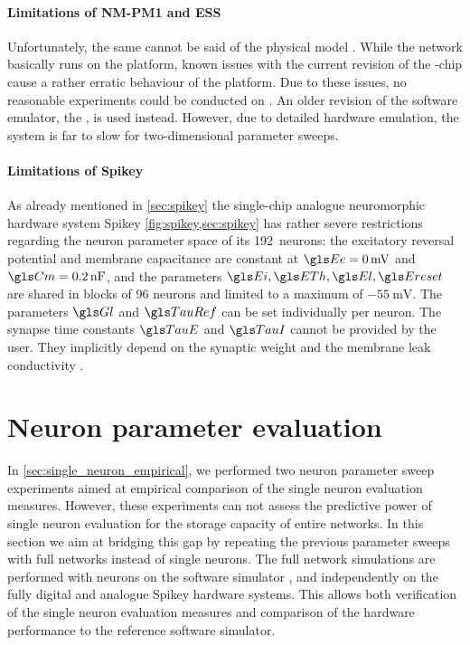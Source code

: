 \paragraph{Limitations of NM-PM1 and ESS}
Unfortunately, the same cannot be said of the physical model \NMPM. While the network basically runs on the platform, known issues with the current revision of the \mbox{\HICANN}-chip cause a rather erratic behaviour of the platform. Due to these issues, no reasonable experiments could be conducted on \NMPM. An older revision of the \NMPM software emulator, the \ESS, is used instead. However, due to detailed hardware emulation, the system is far to slow for two-dimensional parameter sweeps.

\paragraph{Limitations of Spikey}
As already mentioned in \cref{sec:spikey} the single-chip analogue neuromorphic hardware system Spikey \cref{fig:spikey,sec:spikey} has rather severe restrictions regarding the neuron parameter space of its 192~\LIF neurons: the excitatory reversal potential and membrane capacitance are constant at $\Ee = \SI{0}{\milli\volt}$ and $\Cm = \SI{0.2}{\nano\farad}$, and the parameters $\Ei, \ETh, \El, \Ereset$ are shared in blocks of 96 neurons and limited to a maximum of $\SI{-55}{\milli\volt}$. The parameters $\Gl$ and $\TauRef$ can be set individually per neuron. The synapse time constants $\TauE$ and $\TauI$ cannot be provided by the user. They implicitly depend on the synaptic weight \wsyn and the membrane leak conductivity \Gl \cite{pfeil2013six}.

\section{Neuron parameter evaluation}
\label{sec:neuron_parameter_sweeps}

In \cref{sec:single_neuron_empirical}, we performed two neuron parameter sweep experiments aimed at empirical comparison of the single neuron evaluation measures. However, these experiments can not assess the predictive power of single neuron evaluation for the storage capacity \info of entire networks. In this section we aim at bridging this gap by repeating the previous parameter sweeps with full \BiNAM networks instead of single neurons. The full network simulations are performed with \LIF neurons on the software simulator \NEST, and independently on the fully digital \NMMC and analogue Spikey hardware systems. This allows both verification of the single neuron evaluation measures and comparison of the hardware performance to the reference software simulator.

